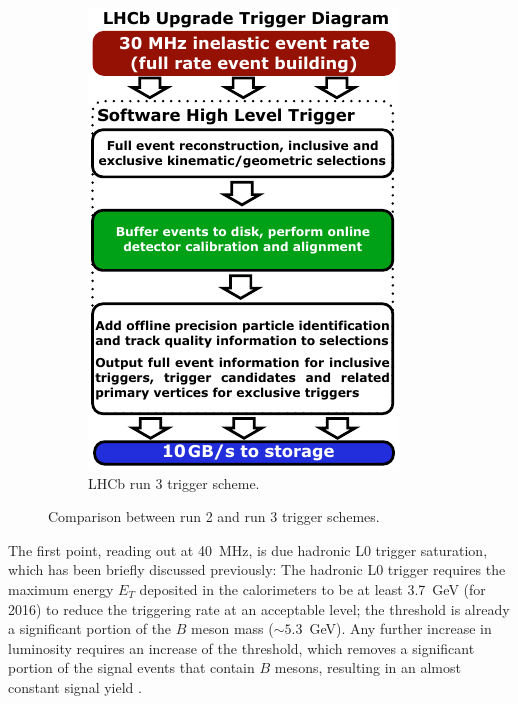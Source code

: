 \begin{figure}[!htb]
\begin{subfigure}[t]{0.36\textwidth}
        \includegraphics[width=\textwidth]{./figs-lhcb-upgrade-overview/trigger/trigger_scheme_run3.pdf}
        \caption{LHCb run 3 trigger scheme.}
    \end{subfigure}

    \caption{
        Comparison between run 2 and run 3 trigger schemes.
    }
    \label{fig:trigger-comp}
\end{figure}

The first point, reading out at 40~MHz, is due hadronic L0 trigger saturation,
which has been briefly discussed previously:
The hadronic L0 trigger requires the maximum energy $E_T$ deposited in the
calorimeters to be at least 3.7~GeV (for 2016) to reduce the triggering rate
at an acceptable level;
the threshold is already a significant portion of the $B$ meson mass
($\sim 5.3$~GeV).
Any further increase in luminosity requires an increase of the threshold,
which removes a significant portion of the signal events
that contain $B$ mesons,
resulting in an almost constant signal yield \cite{CERN-LHCC-2011-001}.

